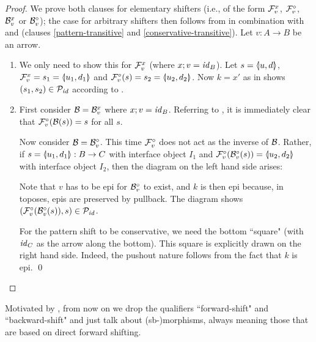 %
\begin{proof}
We prove both clauses for elementary shifters (i.e., of the form $\rF v x$, $\dF v$, $\rB v x$ or $\dB v$); the case for arbitrary shifters then follows from  in combination with  and  (clauses \ref{pattern-transitive} and \ref{conservative-transitive}). Let $v:A\to B$ be an arrow.
\begin{enumerate}[topsep=\smallskipamount]
\item We only need to show this for $\rF v x$ (where $x;v=\id_B$). Let $s=\spanof u d$, $\rF v x=s_1=\spanof{u_1}{d_1}$ and $\dF v(s)=s_2=\spanof{u_2}{d_2}$. Now $k=x'$ as in \cite{sb-shifters} shows $(s_1,s_2)\in \cP_\id$ according to .

\item First consider $\cB=\rB v x$ where $x;v=\id_B$. Referring to , it is immediately clear that $\dF v(\cB(s))=s$ for all $s$.

Now consider $\cB=\dB v$. This time $\dF v$ does not act as the inverse of $\cB$. Rather, if $s=\spanof{u_1}{d_1}:B\to C$ with interface object $I_1$ and $\dF v(\dB v(s))=\spanof{u_2}{d_2}$ with interface object $I_2$, then the diagram on the left hand side arises:
\begin{center}
\qquad
{}
\end{center}
Note that $v$ has to be epi for $\dB v$ to exist, and $k$ is then epi because, in toposes, epis are preserved by pullback. The diagram shows $(\dF v(\dB v(s)),s)\in \cP_\id$.

For the pattern shift to be conservative, we need the bottom ``square" (with $\id_C$ as the arrow along the bottom). This square is explicitly drawn on the right hand side. Indeed, the pushout nature follows from the fact that $k$ is epi.
\qed
\end{enumerate}
\end{proof}
%
Motivated by , from now on we drop the qualifiers ``forward-shift" and ``backward-shift" and just talk about (sb-)morphisms, always meaning those that are based on direct forward shifting.

